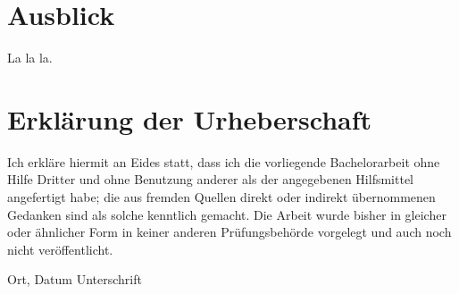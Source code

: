 \documentclass[11pt,a4paper,twoside,ngerman,openany,bibliography=totoc]{scrbook}
\theoremstyle{plain}
\theoremstyle{definition}
\begin{document}





\chapter{Ausblick}
La la la.

\backmatter
\printbibliography[title=Literaturverzeichnis]

\chapter*{Erklärung der Urheberschaft}

Ich erkläre hiermit an Eides statt, dass ich die vorliegende Bachelorarbeit ohne Hilfe Dritter und ohne Benutzung anderer als der angegebenen Hilfsmittel angefertigt habe; die aus fremden Quellen direkt oder indirekt übernommenen Gedanken sind als solche kenntlich gemacht. Die Arbeit wurde bisher in gleicher oder ähnlicher Form in keiner anderen Prüfungsbehörde vorgelegt und auch noch nicht veröffentlicht.

\vspace{3cm}
\hspace{2cm} Ort, Datum \hfill Unterschrift \hspace{2cm}
\clearpage
\end{document}
